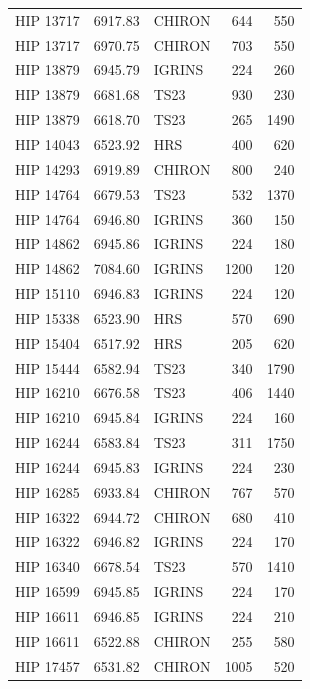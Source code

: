 \begin{scriptsize}
\begin{longtable}{|l|rlrr|}
   HIP 13717 &  6917.83 &     CHIRON &      644 &   550 \\
   HIP 13717 &  6970.75 &     CHIRON &      703 &   550 \\
   HIP 13879 &  6945.79 &     IGRINS &      224 &   260 \\
   HIP 13879 &  6681.68 &       TS23 &      930 &   230 \\
   HIP 13879 &  6618.70 &       TS23 &      265 &  1490 \\
   HIP 14043 &  6523.92 &        HRS &      400 &   620 \\
   HIP 14293 &  6919.89 &     CHIRON &      800 &   240 \\
   HIP 14764 &  6679.53 &       TS23 &      532 &  1370 \\
   HIP 14764 &  6946.80 &     IGRINS &      360 &   150 \\
   HIP 14862 &  6945.86 &     IGRINS &      224 &   180 \\
   HIP 14862 &  7084.60 &     IGRINS &     1200 &   120 \\
   HIP 15110 &  6946.83 &     IGRINS &      224 &   120 \\
   HIP 15338 &  6523.90 &        HRS &      570 &   690 \\
   HIP 15404 &  6517.92 &        HRS &      205 &   620 \\
   HIP 15444 &  6582.94 &       TS23 &      340 &  1790 \\
   HIP 16210 &  6676.58 &       TS23 &      406 &  1440 \\
   HIP 16210 &  6945.84 &     IGRINS &      224 &   160 \\
   HIP 16244 &  6583.84 &       TS23 &      311 &  1750 \\
   HIP 16244 &  6945.83 &     IGRINS &      224 &   230 \\
   HIP 16285 &  6933.84 &     CHIRON &      767 &   570 \\
   HIP 16322 &  6944.72 &     CHIRON &      680 &   410 \\
   HIP 16322 &  6946.82 &     IGRINS &      224 &   170 \\
   HIP 16340 &  6678.54 &       TS23 &      570 &  1410 \\
   HIP 16599 &  6945.85 &     IGRINS &      224 &   170 \\
   HIP 16611 &  6946.85 &     IGRINS &      224 &   210 \\
   HIP 16611 &  6522.88 &     CHIRON &      255 &   580 \\
   HIP 17457 &  6531.82 &     CHIRON &     1005 &   520 \\

\end{longtable}
\end{scriptsize}
